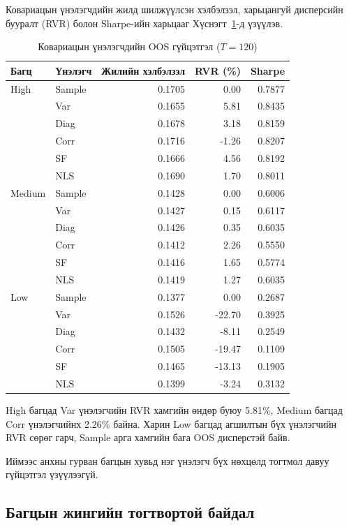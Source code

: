 Ковариацын үнэлэгчдийн жилд шилжүүлсэн
хэлбэлзэл, харьцангуй дисперсийн бууралт
(RVR) болон Sharpe-ийн харьцааг
Хүснэгт~\ref{tab:oos_performance}-д үзүүлэв.

\begin{table}[htbp]
	\centering
	\caption{Ковариацын үнэлэгчдийн OOS гүйцэтгэл ($T=120$)}
	\label{tab:oos_performance}
	\small
	\begin{tabular}{llrrr}
		\hline
		Багц & Үнэлэгч &
		Жилийн хэлбэлзэл & RVR (\%) & Sharpe\\
		\hline
		High & Sample & 0.1705 & 0.00 & 0.7877\\
		& Var  & 0.1655 & 5.81 & 0.8435\\
		& Diag & 0.1678 & 3.18 & 0.8159\\
		& Corr & 0.1716 & -1.26 & 0.8207\\
		& SF   & 0.1666 & 4.56 & 0.8192\\
		& NLS  & 0.1690 & 1.70 & 0.8011\\
		\hline
		Medium & Sample & 0.1428 & 0.00 & 0.6006\\
		& Var  & 0.1427 & 0.15 & 0.6117\\
		& Diag & 0.1426 & 0.35 & 0.6035\\
		& Corr & 0.1412 & 2.26 & 0.5550\\
		& SF   & 0.1416 & 1.65 & 0.5774\\
		& NLS  & 0.1419 & 1.27 & 0.6035\\
		\hline
		Low & Sample & 0.1377 & 0.00 & 0.2687\\
		& Var  & 0.1526 & -22.70 & 0.3925\\
		& Diag & 0.1432 & -8.11 & 0.2549\\
		& Corr & 0.1505 & -19.47 & 0.1109\\
		& SF   & 0.1465 & -13.13 & 0.1905\\
		& NLS  & 0.1399 & -3.24 & 0.3132\\
		\hline
	\end{tabular}
\end{table}

High багцад Var үнэлэгчийн RVR хамгийн
өндөр буюу 5.81\%, Medium багцад Corr
үнэлэгчийнх 2.26\% байна. Харин Low
багцад агшилтын бүх үнэлэгчийн RVR
сөрөг гарч, Sample арга хамгийн бага
OOS дисперстэй байв.

Иймээс анхны гурван багцын хувьд нэг
үнэлэгч бүх нөхцөлд тогтмол давуу
гүйцэтгэл үзүүлээгүй.

\subsection{Багцын жингийн тогтвортой байдал}
\label{subsec:portfolio_stability}

